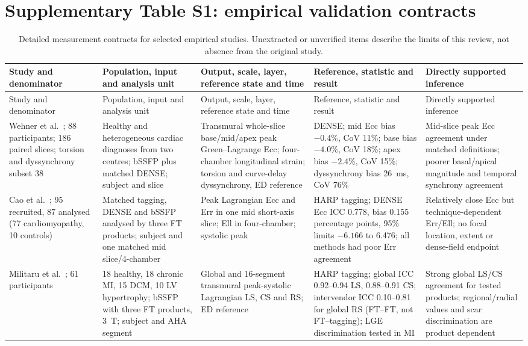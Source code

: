 \documentclass[11pt,a4paper]{article}
\begin{document}
\setcounter{table}{0}
\renewcommand{\theHtable}{supplement-numbered.\arabic{table}}
\section*{Supplementary Table S1: empirical validation contracts}

{\scriptsize\sloppy
\begin{longtable}{L{0.12\textwidth}L{0.16\textwidth}L{0.17\textwidth}L{0.20\textwidth}L{0.15\textwidth}}
\caption{Detailed measurement contracts for selected empirical studies. Unextracted or unverified items describe the limits of this review, not absence from the original study.}\\
\toprule
Study and denominator & Population, input and analysis unit & Output, scale, layer, reference state and time & Reference, statistic and result & Directly supported inference \\
\midrule
\endfirsthead
\toprule
Study and denominator & Population, input and analysis unit & Output, scale, layer, reference state and time & Reference, statistic and result & Directly supported inference \\
\midrule
\endhead
Wehner et al.~\cite{wehner2018}; 88 participants; 186 paired slices; torsion and dyssynchrony subset 38 & Healthy and heterogeneous cardiac diagnoses from two centres; bSSFP plus matched DENSE; subject and slice & Transmural whole-slice base/mid/apex peak Green--Lagrange Ecc; four-chamber longitudinal strain; torsion and curve-delay dyssynchrony, ED reference & DENSE; mid Ecc bias $-0.4\%$, CoV 11\%; base bias $-4.0\%$, CoV 18\%; apex bias $-2.4\%$, CoV 15\%; dyssynchrony bias 26~ms, CoV 76\% & Mid-slice peak Ecc agreement under matched definitions; poorer basal/apical magnitude and temporal synchrony agreement \\
\addlinespace
Cao et al.~\cite{cao2018}; 95 recruited, 87 analysed (77 cardiomyopathy, 10 controls) & Matched tagging, DENSE and bSSFP analysed by three FT products; subject and one matched mid slice/4-chamber & Peak Lagrangian Ecc and Err in one mid short-axis slice; Ell in four-chamber; systolic peak & HARP tagging; DENSE Ecc ICC 0.778, bias 0.155 percentage points, 95\% limits $-6.166$ to 6.476; all methods had poor Err agreement & Relatively close Ecc but technique-dependent Err/Ell; no focal location, extent or dense-field endpoint \\
\addlinespace
Militaru et al.~\cite{militaru2021}; 61 participants & 18 healthy, 18 chronic MI, 15 DCM, 10 LV hypertrophy; bSSFP with three FT products, 3~T; subject and AHA segment & Global and 16-segment transmural peak-systolic Lagrangian LS, CS and RS; ED reference & HARP tagging; global ICC 0.92--0.94 LS, 0.88--0.91 CS; intervendor ICC 0.10--0.81 for global RS (FT--FT, not FT--tagging); LGE discrimination tested in MI & Strong global LS/CS agreement for tested products; regional/radial values and scar discrimination are product dependent \\

\end{longtable}}
\end{document}
